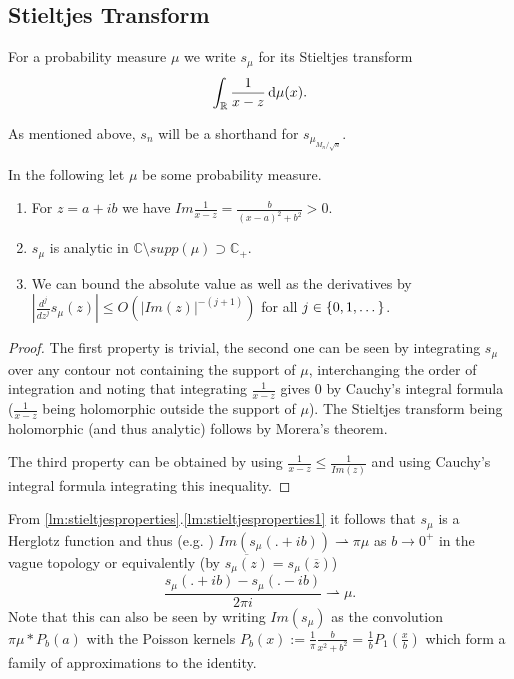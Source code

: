 \subsection{Stieltjes Transform}

\begin{definition}
	For a probability measure $\mu$ we write $s_\mu$ for its Stieltjes transform $$\int_\mathbb{R} \frac{1}{x-z}\mathop{}\!\mathrm{d}\mu(x).$$
\end{definition}
As mentioned above, $s_n$ will be a shorthand for $s_{\mu_{M_n/\sqrt{n}}}$.

\begin{lemma}\label{lm:stieltjesproperties}
In the following let $\mu$ be some probability measure.
	\begin{enumerate}
		\item For $z=a+ib$ we have $Im\frac{1}{x-z}=\frac{b}{(x-a)^2+b^2}>0$.\label{lm:stieltjesproperties1}
		\item $s_\mu$ is analytic in $\mathbb C\setminus supp(\mu)\supset\mathbb C_+$.\label{lm:stieltjesproperties2}
		\item We can bound the absolute value as well as the derivatives by $|\frac{d^j}{dz^j}s_\mu(z)|\leq O(|Im(z)|^{-(j+1)})$ for all $j\in\mathbb \{0,1,\dots\}$.\label{lm:stieltjesproperties3}
	\end{enumerate}
\end{lemma}

\begin{proof}
	The first property is trivial, the second one can be seen by integrating $s_\mu$ over any contour not containing the support of $\mu$, interchanging the order of integration and noting that integrating $\frac{1}{x-z}$ gives $0$ by Cauchy's integral formula ($\frac{1}{x-z}$ being holomorphic outside the support of $\mu$). The Stieltjes transform being holomorphic (and thus analytic) follows by Morera's theorem.
	
	The third property can be obtained by using $\frac{1}{x-z}\leq \frac{1}{Im(z)}$ and using Cauchy's integral formula integrating this inequality.
\end{proof}

\begin{corollary}
	From \ref{lm:stieltjesproperties}.\ref{lm:stieltjesproperties1} it follows that $s_\mu$ is a Herglotz function and thus (e.g. \cite{TeschlQM}) $Im(s_\mu(.+ib))\rightharpoonup\pi\mu$ as $b\rightarrow 0^+$ in the vague topology or equivalently (by $\overline{s_\mu(z)}=s_\mu(\overline z)$)
	\begin{equation}
		\frac{s_\mu(.+ib)-s_\mu(.-ib)}{2\pi i}\rightharpoonup\mu.
	\end{equation}
	Note that this can also be seen by writing $Im(s_\mu)$ as the convolution $\pi\mu * P_b(a)$ with the Poisson kernels $P_b(x):=\frac{1}{\pi}\frac{b}{x^2+b^2} = \frac{1}{b}P_1(\frac{x}{b})$ which form a family of approximations to the identity.
\end{corollary}


